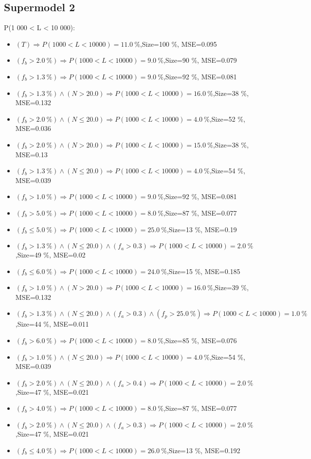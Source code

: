 \documentclass[numbered]{CSL}
\begin{document}
\subsection{Supermodel 2}
P(1 000 < L < 10 000):
\begin{itemize}
\item $(T) \Rightarrow P(1 000 < L < 10 000) = 11.0~\%$,\hfill Size=100 \%, MSE=0.095
\item $(f_b > 2.0~\%) \Rightarrow P(1 000 < L < 10 000) = 9.0~\%$,\hfill Size=90 \%, MSE=0.079
\item $(f_b > 1.3~\%) \Rightarrow P(1 000 < L < 10 000) = 9.0~\%$,\hfill Size=92 \%, MSE=0.081
\item $(f_b > 1.3~\%) \land (N > 20.0) \Rightarrow P(1 000 < L < 10 000) = 16.0~\%$,\hfill Size=38 \%, MSE=0.132
\item $(f_b > 2.0~\%) \land (N \leq 20.0) \Rightarrow P(1 000 < L < 10 000) = 4.0~\%$,\hfill Size=52 \%, MSE=0.036
\item $(f_b > 2.0~\%) \land (N > 20.0) \Rightarrow P(1 000 < L < 10 000) = 15.0~\%$,\hfill Size=38 \%, MSE=0.13
\item $(f_b > 1.3~\%) \land (N \leq 20.0) \Rightarrow P(1 000 < L < 10 000) = 4.0~\%$,\hfill Size=54 \%, MSE=0.039
\item $(f_b > 1.0~\%) \Rightarrow P(1 000 < L < 10 000) = 9.0~\%$,\hfill Size=92 \%, MSE=0.081
\item $(f_b > 5.0~\%) \Rightarrow P(1 000 < L < 10 000) = 8.0~\%$,\hfill Size=87 \%, MSE=0.077
\item $(f_b \leq 5.0~\%) \Rightarrow P(1 000 < L < 10 000) = 25.0~\%$,\hfill Size=13 \%, MSE=0.19
\item $(f_b > 1.3~\%) \land (N \leq 20.0) \land (f_a > 0.3) \Rightarrow P(1 000 < L < 10 000) = 2.0~\%$,\hfill Size=49 \%, MSE=0.02
\item $(f_b \leq 6.0~\%) \Rightarrow P(1 000 < L < 10 000) = 24.0~\%$,\hfill Size=15 \%, MSE=0.185
\item $(f_b > 1.0~\%) \land (N > 20.0) \Rightarrow P(1 000 < L < 10 000) = 16.0~\%$,\hfill Size=39 \%, MSE=0.132
\item $(f_b > 1.3~\%) \land (N \leq 20.0) \land (f_a > 0.3) \land (f_p > 25.0~\%) \Rightarrow P(1 000 < L < 10 000) = 1.0~\%$,\hfill Size=44 \%, MSE=0.011
\item $(f_b > 6.0~\%) \Rightarrow P(1 000 < L < 10 000) = 8.0~\%$,\hfill Size=85 \%, MSE=0.076
\item $(f_b > 1.0~\%) \land (N \leq 20.0) \Rightarrow P(1 000 < L < 10 000) = 4.0~\%$,\hfill Size=54 \%, MSE=0.039
\item $(f_b > 2.0~\%) \land (N \leq 20.0) \land (f_a > 0.4) \Rightarrow P(1 000 < L < 10 000) = 2.0~\%$,\hfill Size=47 \%, MSE=0.021
\item $(f_b > 4.0~\%) \Rightarrow P(1 000 < L < 10 000) = 8.0~\%$,\hfill Size=87 \%, MSE=0.077
\item $(f_b > 2.0~\%) \land (N \leq 20.0) \land (f_a > 0.3) \Rightarrow P(1 000 < L < 10 000) = 2.0~\%$,\hfill Size=47 \%, MSE=0.021
\item $(f_b \leq 4.0~\%) \Rightarrow P(1 000 < L < 10 000) = 26.0~\%$,\hfill Size=13 \%, MSE=0.192
\end{itemize}
\end{document}
